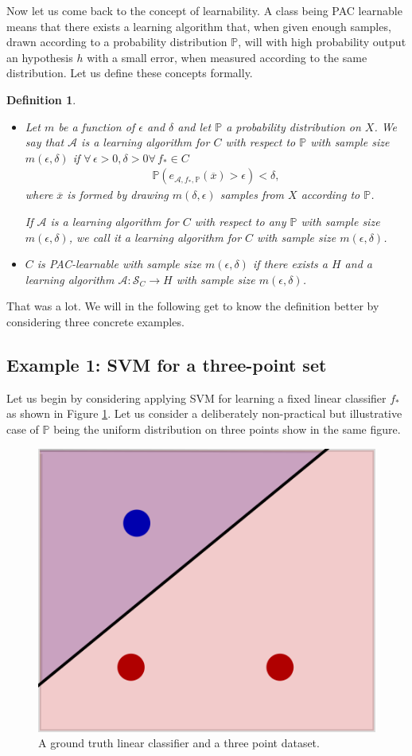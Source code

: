 \documentclass{article}
\newcommand{\calA}{\mathcal{A}}
\newcommand{\calS}{\mathcal{S}}
\newtheorem{defi}{Definition}
\begin{document}
Now let us come back to the concept of learnability. A class being PAC learnable means that there exists a learning algorithm that, when given enough samples, drawn according to a probability distribution $\mathbb{P}$, will with high probability output an hypothesis $h$ with a small error, when measured according to the same distribution. Let us define these concepts formally.
\begin{defi}
    \begin{itemize}
        \item Let $m$ be a function of $\epsilon$ and $\delta$ and let $\mathbb{P}$ a probability distribution on $X$. We say that $\calA$ is a \emph{learning algorithm for $C$ with respect to $\mathbb{P}$ with sample size $m(\epsilon,\delta)$} if  $\forall \, \epsilon>0 , \delta>0 \forall \, f_* \in C$
        \begin{align*}
          \mathbb{P}( e_{\calA,f_*,\mathbb{P}}(\overline{x}) >\epsilon)<\delta,
        \end{align*}
        where $\overline{x}$ is formed by drawing $m(\delta,\epsilon)$ samples from $X$ according to $\mathbb{P}$. 

        If $\calA$ is a learning algorithm for $C$ with respect to any $\mathbb{P}$ with sample size $m(\epsilon,\delta)$, we call it a \emph{learning algorithm for $C$ with sample size $m(\epsilon,\delta)$.}
        \item $C$ is \emph{PAC-learnable} with sample size $m(\epsilon,\delta)$ if there exists a $H$ and a learning algorithm $\calA : \calS_C\to H$ with sample size $m(\epsilon,\delta)$. 
    \end{itemize}
\end{defi}

That was a lot. We will in the following get to know the definition better by considering three concrete examples.

\subsection{Example 1: SVM for a three-point set}
Let us begin by considering applying SVM for learning a fixed linear classifier $f_*$ as shown in Figure \ref{fig:gt_svm}. Let us consider a deliberately non-practical but illustrative case of $\mathbb{P}$ being the uniform distribution on three points show in the same figure.

\begin{figure} 
    \centering\includegraphics[width=0.5\linewidth]{graphics/ground_truth_svm.png}
    \caption{A ground truth linear classifier and a three point dataset.}
  \label{fig:gt_svm}
\end{figure}
\end{document}
